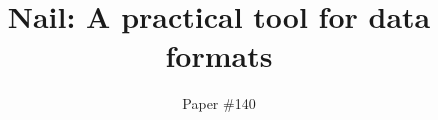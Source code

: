 \documentclass[10pt,twocolumn]{article}
\begin{document}
\author{Paper \#140}
\date{}
\title{Nail: A practical tool for data formats}

\maketitle










% 



\end{document}
